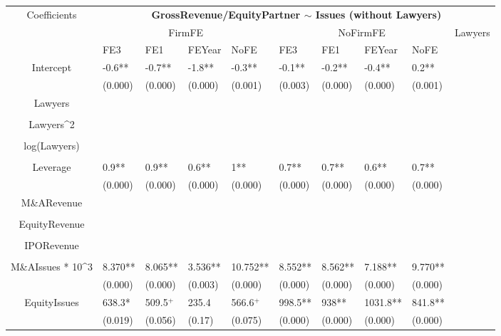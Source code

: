 \documentclass{article}
\begin{document}
\begin{table}[H]
\centering
\begin{tabular}{|clllllllll|}
\hline
\multirow{3}{*}{Coefficients} & \multicolumn{9}{c|}{\textbf{GrossRevenue/EquityPartner $\sim$ Issues (without Lawyers)}} \\
\cline{2-10}
& \multicolumn{4}{c}{FirmFE} & \multicolumn{4}{c}{NoFirmFE} & \multirow{2}{*}{Lawyers} \\
\cline{2-9}
& FE3 & FE1 & FEYear & NoFE & FE3 & FE1 & FEYear & NoFE &  \\
\hline
 
Intercept & -0.6** & -0.7** & -1.8** & -0.3** & -0.1** & -0.2** & -0.4** & 0.2** & \\ 
   & (0.000) & (0.000) & (0.000) & (0.001) & (0.003) & (0.000) & (0.000) & (0.001) & \\ 
  Lawyers &  &  &  &  &  &  &  &  & \\ 
   &  &  &  &  &  &  &  &  & \\ 
  Lawyers^2 &  &  &  &  &  &  &  &  & \\ 
   &  &  &  &  &  &  &  &  & \\ 
  log(Lawyers) &  &  &  &  &  &  &  &  & \\ 
   &  &  &  &  &  &  &  &  & \\ 
  Leverage & 0.9** & 0.9** & 0.6** & 1** & 0.7** & 0.7** & 0.6** & 0.7** & \\ 
   & (0.000) & (0.000) & (0.000) & (0.000) & (0.000) & (0.000) & (0.000) & (0.000) & \\ 
  M\&ARevenue &  &  &  &  &  &  &  &  & \\ 
   &  &  &  &  &  &  &  &  & \\ 
  EquityRevenue &  &  &  &  &  &  &  &  & \\ 
   &  &  &  &  &  &  &  &  & \\ 
  IPORevenue &  &  &  &  &  &  &  &  & \\ 
   &  &  &  &  &  &  &  &  & \\ 
  M\&AIssues * 10^3 & 8.370** & 8.065** & 3.536** & 10.752** & 8.552** & 8.562** & 7.188** & 9.770** & \\ 
   & (0.000) & (0.000) & (0.003) & (0.000) & (0.000) & (0.000) & (0.000) & (0.000) & \\ 
  EquityIssues & 638.3* & 509.5$^{+}$ & 235.4 & 566.6$^{+}$ & 998.5** & 938** & 1031.8** & 841.8** & \\ 
   & (0.019) & (0.056) & (0.17) & (0.075) & (0.000) & (0.000) & (0.000) & (0.000) & \\ 

\end{tabular}
\end{table}
\end{document}
